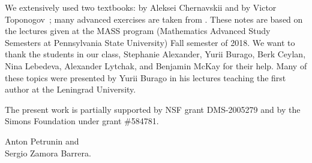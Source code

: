 We extensively used two textbooks: by Aleksei Chernavskii \cite{chernavsky} and by Victor Toponogov~\cite{toponogov-book};
many advanced exercises are taken from \cite{petrunin2020}.
These notes are based on the lectures given at the MASS program (Mathematics Advanced Study Semesters at Pennsylvania State University) Fall semester of 2018.
We want to thank the students in our class, 
Stephanie Alexander,
Yurii Burago, 
Berk Ceylan,
Nina Lebedeva,
Alexander Lytchak,
and Benjamin McKay
for their help.
Many of these topics were presented by Yurii Burago in his lectures teaching the first author at the Leningrad University.

The present work is partially supported by NSF grant DMS-2005279
and by the Simons Foundation under grant \#584781.

\begin{flushright}
Anton Petrunin and\\
Sergio Zamora Barrera.
\end{flushright}




